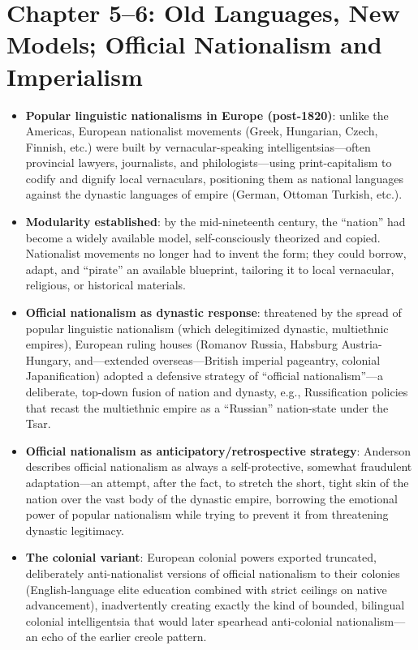 \documentclass[12pt]{article}
\begin{document}
\section{Chapter 5--6: Old Languages, New Models; Official Nationalism and Imperialism}

\begin{itemize}[leftmargin=*, itemsep=4pt]
    \item \textbf{Popular linguistic nationalisms in Europe (post-1820)}: unlike the Americas, European nationalist movements (Greek, Hungarian, Czech, Finnish, etc.) were built by vernacular-speaking intelligentsias---often provincial lawyers, journalists, and philologists---using print-capitalism to codify and dignify local vernaculars, positioning them as national languages against the dynastic languages of empire (German, Ottoman Turkish, etc.).
    \item \textbf{Modularity established}: by the mid-nineteenth century, the ``nation'' had become a widely available model, self-consciously theorized and copied. Nationalist movements no longer had to invent the form; they could borrow, adapt, and ``pirate'' an available blueprint, tailoring it to local vernacular, religious, or historical materials.
    \item \textbf{Official nationalism as dynastic response}: threatened by the spread of popular linguistic nationalism (which delegitimized dynastic, multiethnic empires), European ruling houses (Romanov Russia, Habsburg Austria-Hungary, and---extended overseas---British imperial pageantry, colonial Japanification) adopted a defensive strategy of ``official nationalism''---a deliberate, top-down fusion of nation and dynasty, e.g., Russification policies that recast the multiethnic empire as a ``Russian'' nation-state under the Tsar.
    \item \textbf{Official nationalism as anticipatory/retrospective strategy}: Anderson describes official nationalism as always a self-protective, somewhat fraudulent adaptation---an attempt, after the fact, to stretch the short, tight skin of the nation over the vast body of the dynastic empire, borrowing the emotional power of popular nationalism while trying to prevent it from threatening dynastic legitimacy.
    \item \textbf{The colonial variant}: European colonial powers exported truncated, deliberately anti-nationalist versions of official nationalism to their colonies (English-language elite education combined with strict ceilings on native advancement), inadvertently creating exactly the kind of bounded, bilingual colonial intelligentsia that would later spearhead anti-colonial nationalism---an echo of the earlier creole pattern.
\end{itemize}
\end{document}
